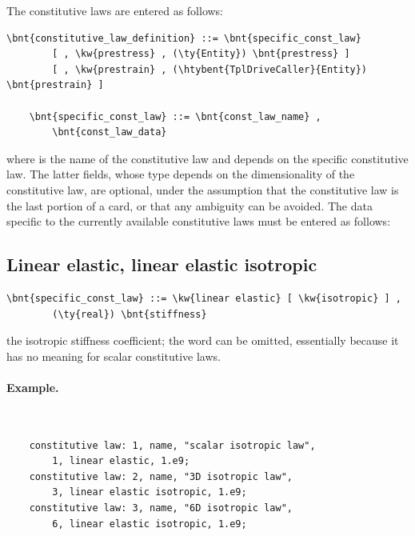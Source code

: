 The constitutive laws are entered as follows:
\begin{Verbatim}[commandchars=\\\{\}]
    \bnt{constitutive_law_definition} ::= \bnt{specific_const_law}
        [ , \kw{prestress} , (\ty{Entity}) \bnt{prestress} ]
        [ , \kw{prestrain} , (\htybent{TplDriveCaller}{Entity}) \bnt{prestrain} ]

    \bnt{specific_const_law} ::= \bnt{const_law_name} ,
        \bnt{const_law_data}
\end{Verbatim}
where  is the name of the constitutive law and
 depends on the specific constitutive law. 
The latter fields, whose type depends on the dimensionality of the
constitutive law, are optional, under the assumption that the
constitutive law is the last portion of a card, or that any ambiguity 
can be avoided.
The data specific to the currently available constitutive laws must be
entered as follows:


\subsection{Linear elastic, linear elastic isotropic}
\begin{Verbatim}[commandchars=\\\{\}]
    \bnt{specific_const_law} ::= \kw{linear elastic} [ \kw{isotropic} ] , 
        (\ty{real}) \bnt{stiffness}
\end{Verbatim}
the isotropic stiffness coefficient; the word 
can be omitted, essentially because it has no meaning
for scalar constitutive laws.

\paragraph{Example.} \
\begin{verbatim}
    constitutive law: 1, name, "scalar isotropic law",
        1, linear elastic, 1.e9;
    constitutive law: 2, name, "3D isotropic law",
        3, linear elastic isotropic, 1.e9;
    constitutive law: 3, name, "6D isotropic law",
        6, linear elastic isotropic, 1.e9;
\end{verbatim}
  
  
